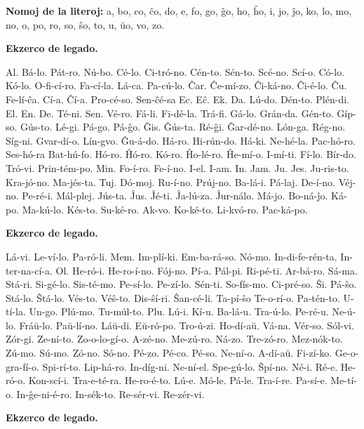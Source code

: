 \textbf{Nomoj de la literoj:} a, bo, co, ĉo, do, e, fo, go, ĝo, ho, ĥo, i, jo, ĵo, ko, lo, mo, no, o, po, ro, so, ŝo, to, u, ŭo, vo, zo.

\begin{center}

{\bf Ekzerco de legado.}
\end{center}

Al. Bá-lo. Pát-ro. Nú-bo. Cé-lo. Ci-tró-no. Cén-to. Sén-to. Scé-no. Scí-o. Có-lo. Kó-lo. O-fi-cí-ro. Fa-cí-la. Lá-ca. Pa-cú-lo. Ĉar. Ĉe-mí-zo. Ĉi-ká-no. Ĉi-é-lo. Ĉu. Fe-lí-ĉa. Cí-a. Ĉí-a. Pro-cé-so. Sen-ĉé-sa Ec. Eĉ. Ek. Da. Lú-do. Dén-to. Plén-di. El. En. De. Té-ni. Sen. Vé-ro. Fá-li. Fi-dé-la. Trá-fi. Gá-lo. Grán-da. Gén-to. Gíp-so. Gús-to. Lé-gi. Pá-go. Pá-ĝo. Ĝis. Ĝús-ta. Ré-ĝi. Ĝar-dé-no. Lón-ga. Rég-no. Síg-ni. Gvar-dí-o. Lín-gvo. Ĝu-á-do. Há-ro. Hi-rún-do. Há-ki. Ne-hé-la. Pac-hó-ro. Ses-hó-ra Bat-hú-fo. Hó-ro. Ĥó-ro. Kó-ro. Ĥo-lé-ro. Ĥe-mí-o. I-mí-ti. Fí-lo. Bír-do. Tró-vi. Prin-tém-po. Min. Fo-í-ro. Fe-í-no. I-el. I-am. In. Jam. Ju. Jes. Ju-ris-to. Kra-jó-no. Ma-jés-ta. Tuj. Dó-moj. Ru-í-no. Prúj-no. Ba-lá-i. Pá-laj. De-í-no. Véj-no. Pe-ré-i. Mál-plej. Jús-ta. Ĵus. Ĵé-ti. Ĵa-lú-za. Ĵur-nálo. Má-jo. Bo-ná-ĵo. Ká-po. Ma-kú-lo. Kés-to. Su-ké-ro. Ak-vo. Ko-ké-to. Li-kvó-ro. Pac-ká-po.

\begin{center}

{\bf Ekzerco de legado.}
\end{center}

Lá-vi. Le-ví-lo. Pa-ró-li. Mem. Im-plí-ki. Em-ba-rá-so. Nó-mo. In-di-fe-rén-ta. In-ter-na-cí-a. Ol. He-ró-i. He-ro-í-no. Fój-no. Pí-a. Pál-pi. Ri-pé-ti. Ar-bá-ro. Sá-ma. Stá-ri. Si-gé-lo. Sis-té-mo. Pe-sí-lo. Pe-zí-lo. Sén-ti. So-fís-mo. Ci-pré-so. Ŝi. Pá-ŝo. Stá-lo. Ŝtá-lo. Vés-to. Véŝ-to. Dis-ŝí-ri. Ŝan-cé-li. Ta-pí-ŝo Te-o-rí-o. Pa-tén-to. U-tí-la. Un-go. Plú-mo. Tu-múl-to. Plu. Lú-i. Kí-u. Ba-lá-u. Tra-ú-lo. Pe-ré-u. Ne-ú-lo. Fráŭ-lo. Paŭ-lí-no. Láŭ-di. Eŭ-ró-po. Tro-ú-zi. Ho-dí-aŭ. Vá-na. Vér-so. Sól-vi. Zór-gi. Ze-ní-to. Zo-o-lo-gí-o. A-zé-no. Me-zú-ro. Ná-zo. Tre-zó-ro. Mez-nók-to. Zú-mo. Sú-mo. Zó-no. Só-no. Pé-zo. Pé-co. Pé-so. Ne-ní-o. A-dí-aŭ. Fi-zí-ko. Ge-o-gra-fí-o. Spi-rí-to. Lip-há-ro. In-díg-ni. Ne-ní-el. Spe-gú-lo. Ŝpí-no. Né-i. Ré-e. He-ró-o. Kon-scí-i. Tra-e-té-ra. He-ro-é-to. Lú-e. Mó-le. Pá-le. Tra-í-re. Pa-sí-e. Me-tí-o. In-ĝe-ni-é-ro. In-sék-to. Re-sér-vi. Re-zér-vi.

\begin{center}

\nopagebreak

{\bf Ekzerco de legado.}
\end{center}

